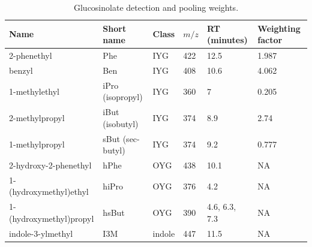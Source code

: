 \documentclass[11pt, oneside]{amsart}
\begin{document}
\vspace{1cm}

\begin{table}[!h]
\small
\caption{Glucosinolate detection and pooling weights.}
\centering
\begin{tabular}{llllll}
\toprule
Name & Short name & Class & $m/z$ & RT (minutes) & Weighting factor\\
\midrule
2-phenethyl & Phe & IYG & 422 & 12.5 & 1.987\\
benzyl & Ben & IYG & 408 & 10.6 & 4.062\\
1-methylethyl & iPro (isopropyl) & IYG & 360 & 7 & 0.205\\
2-methylpropyl & iBut (isobutyl) & IYG & 374 & 8.9 & 2.74\\
1-methylpropyl & sBut (sec-butyl) & IYG & 374 & 9.2 & 0.777\\
2-hydroxy-2-phenethyl & hPhe & OYG & 438 & 10.1 & NA\\
1-(hydroxymethyl)ethyl & hiPro & OYG & 376 & 4.2 & NA\\
1-(hydroxymethyl)propyl & hsBut & OYG & 390 & 4.6, 6.3, 7.3 & NA\\
indole-3-ylmethyl & I3M & indole & 447 & 11.5 & NA\\
\bottomrule
\end{tabular}
\label{tableS6}
\end{table}

\newpage
\end{document}
